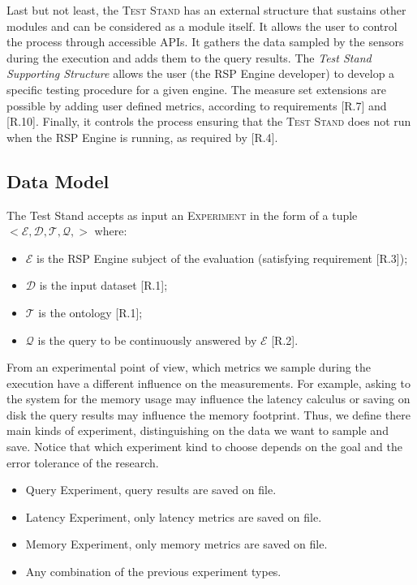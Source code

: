 Last but not least, the \textsc{Test Stand} has an external structure that sustains other modules and can be considered as a module itself. It allows the user to control the process through accessible APIs. It gathers the data sampled by the sensors during the execution and adds them to the query results. The \textit{Test Stand Supporting Structure} allows the user (the RSP Engine developer) to develop a specific testing procedure for a given engine. The measure set extensions are possible by adding user defined metrics, according to requirements [R.7] and [R.10]. Finally, it controls the process ensuring that the \textsc{Test Stand} does not run when the RSP Engine is running, as required by [R.4].

\subsection{Data Model}\label{sec:test-stand-data-model}

\noindent The Test Stand accepts as input an \textsc{Experiment} in the form of a tuple \\ $<\mathcal{E},\mathcal{D},\mathcal{T},\mathcal{Q},>$ where:
\begin{itemize}
\item $\mathcal{E}$ is the RSP Engine subject of the evaluation (satisfying requirement [R.3]); 
\item $\mathcal{D}$ is the input dataset [R.1]; 
\item $\mathcal{T}$ is the ontology [R.1]; 
\item $\mathcal{Q}$ is the query to be continuously answered by $\mathcal{E}$ [R.2]. 
\end{itemize}

From an experimental point of view, which metrics we sample during the execution have a different influence on the measurements. For example, asking to the system for the memory usage may influence the latency calculus or saving on disk the query results may influence the memory footprint. Thus, we define there main kinds of experiment, distinguishing on the data we want to sample and save. Notice that which experiment kind to choose depends on the goal and the error tolerance of the research.

\begin{itemize}
\item Query Experiment, query results are saved on file.
\item Latency Experiment, only latency metrics are saved on file.
\item Memory Experiment, only memory metrics are saved on file.
\item Any combination of the previous experiment types.
\end{itemize}

